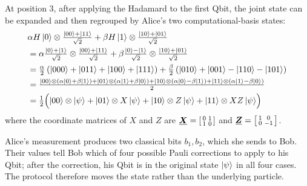 At position \(3\), after applying the Hadamard to the first Qbit, the joint state can be expanded and then regrouped by Alice's two computational-basis states:
\[
\begin{aligned}
&
\alpha H\ket{0}\otimes\tfrac{\ket{00}+\ket{11}}{\sqrt{2}}
+
\beta H\ket{1}\otimes\tfrac{\ket{10}+\ket{01}}{\sqrt{2}}
\\
&=
\alpha \tfrac{\ket{0}+\ket{1}}{\sqrt{2}}\otimes\tfrac{\ket{00}+\ket{11}}{\sqrt{2}}
+
\beta \tfrac{\ket{0}-\ket{1}}{\sqrt{2}}\otimes\tfrac{\ket{10}+\ket{01}}{\sqrt{2}}
\\
&=
\tfrac{\alpha}{2}
\left(
\ket{000}+\ket{011}+\ket{100}+\ket{111}
\right)
+
\tfrac{\beta}{2}
\left(
\ket{010}+\ket{001}-\ket{110}-\ket{101}
\right)
\\
&=
\tfrac{
\ket{00}\otimes(\alpha\ket{0}+\beta\ket{1})
+
\ket{01}\otimes(\alpha\ket{1}+\beta\ket{0})
+
\ket{10}\otimes(\alpha\ket{0}-\beta\ket{1})
+
\ket{11}\otimes(\alpha\ket{1}-\beta\ket{0})
}{2}
\\
&=
\tfrac{1}{2}\Bigl(
\ket{00}\otimes\ket{\psi}
+
\ket{01}\otimes X\ket{\psi}
+
\ket{10}\otimes Z\ket{\psi}
+
\ket{11}\otimes XZ\ket{\psi}
\Bigr)
\end{aligned}
\]
where the coordinate matrices of \(X\) and \(Z\) are
\(
\matr{X}
=
\left[
\begin{smallmatrix}
0&1\\
1&0
\end{smallmatrix}
\right]
\) 
and
\(
\matr{Z}
=
\left[
\begin{smallmatrix}
1&0\\
0&-1
\end{smallmatrix}
\right]
\).


Alice's measurement produces two classical bits \(b_1,b_2\), which she sends to Bob.
Their values tell Bob which of four possible Pauli corrections to apply to his Qbit; 
after the correction, his Qbit is in the original state \(\ket{\psi}\) in all four cases.
The protocol therefore moves the state rather than the underlying particle.

